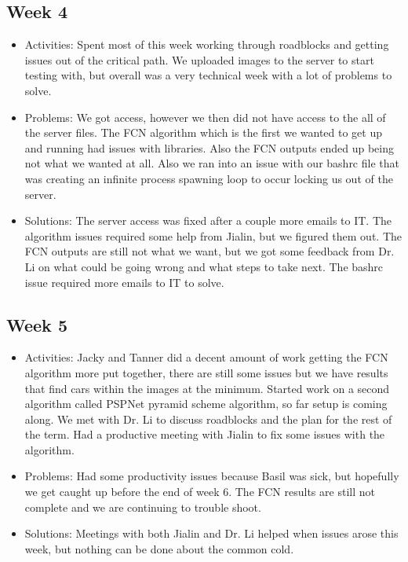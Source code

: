 \documentclass[10pt,draftclsnofoot,onecolumn,journal,compsoc]{IEEEtran}
\begin{document}
\subsection{Week 4}
\begin{itemize}
\item Activities:
Spent most of this week working through roadblocks and getting issues out of the critical path. We uploaded images to the server to start testing with, but overall was a very technical week with a lot of problems to solve.
\item Problems: 
We got access, however we then did not have access to the all of the server files. The FCN algorithm which is the first we wanted to get up and running had issues with libraries. Also the FCN outputs ended up being not what we wanted at all. Also we ran into an issue with our bashrc file that was creating an infinite process spawning loop to occur locking us out of the server.
\item Solutions: 
The server access was fixed after a couple more emails to IT. The algorithm issues required some help from Jialin, but we figured them out. The FCN outputs are still not what we want, but we got some feedback from Dr. Li on what could be going wrong and what steps to take next. The bashrc issue required more emails to IT to solve. 
\end{itemize}

\subsection{Week 5}
\begin{itemize}
\item Activities: Jacky and Tanner did a decent amount of work getting the FCN algorithm more put together, there are still some issues but we have results that find cars within the images at the minimum. Started work on a second algorithm called PSPNet pyramid scheme algorithm, so far setup is coming along. We met with Dr. Li to discuss roadblocks and the plan for the rest of the term. Had a productive meeting with Jialin to fix some issues with the algorithm. 
\item Problems: 
Had some productivity issues because Basil was sick, but hopefully we get caught up before the end of week 6. The FCN results are still not complete and we are continuing to trouble shoot. 
\item Solutions: 
Meetings with both Jialin and Dr. Li helped when issues arose this week, but nothing can be done about the common cold. 
\end{itemize}
\end{document}

